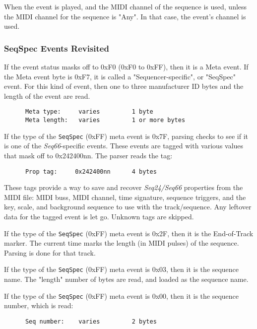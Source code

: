    When the event is played,
   and the MIDI channel of the sequence is used, unless
   the MIDI channel for the sequence is "Any".
   In that case, the event's channel is used.

\subsubsection{SeqSpec Events Revisited}
\label{subsubsec:midi_format_seqspec_events_revisited}

   If the event status masks off to 0xF0 (0xF0 to 0xFF), then it is a Meta
   event.  If the Meta event byte is 0xF7, it is called a "Sequencer-specific",
   or "SeqSpec" event.  For this kind of event, then one to three manufacturer
   ID bytes and the length of the event are read.

   \begin{verbatim}
      Meta type:     varies         1 byte
      Meta length:   varies         1 or more bytes
   \end{verbatim}

   If the type of the
   \texttt{SeqSpec} (0xFF) meta event is 0x7F, parsing checks to see
   if it is one of the \textsl{Seq66}-specific events.  These events are tagged
   with various values that mask off to 0x242400nn.  The parser reads the
   tag:

   \begin{verbatim}
      Prop tag:     0x242400nn      4 bytes
   \end{verbatim}

   These tags provide a way to save and recover \textsl{Seq24/Seq66} properties
   from the MIDI file: MIDI buss, MIDI channel, time signature, sequence
   triggers, and the key, scale, and background sequence to use with the
   track/sequence.  Any leftover data for the tagged event is let go.
   Unknown tags are skipped.

   If the type of the
   \texttt{SeqSpec} (0xFF) meta event is 0x2F, then it is the
   End-of-Track marker.  The current time marks the length (in MIDI pulses) of
   the sequence.  Parsing is done for that track.

   If the type of the
   \texttt{SeqSpec} (0xFF) meta event is 0x03, then it is the
   sequence name.  The "length" number of bytes are read, and loaded as the
   sequence name.

   If the type of the
   \texttt{SeqSpec} (0xFF) meta event is 0x00, then it is the
   sequence number, which is read:

   \begin{verbatim}
      Seq number:    varies         2 bytes
   \end{verbatim}

